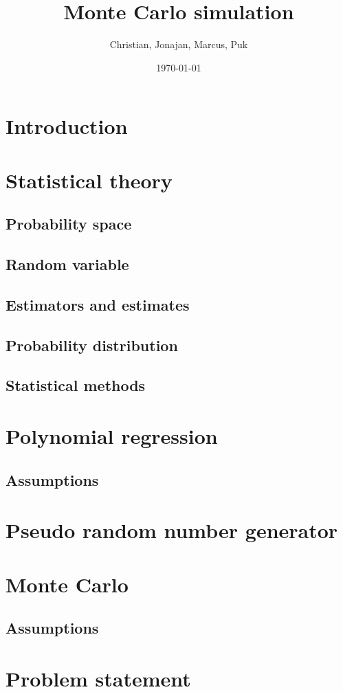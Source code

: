 \documentclass{article}
\title{Monte Carlo simulation}
\author{Christian, Jonajan, Marcus, Puk }
\date{\today}
\begin{document}
	\maketitle
	\newpage
	\tableofcontents
	\newpage
	\section{Introduction}
	\newpage
	\section{Statistical theory}
	\subsection{Probability space}
	\subsection{Random variable}
	\subsection{Estimators and estimates}
	\subsection{Probability distribution}
	\subsection{Statistical methods}
	\newpage
	\section{Polynomial regression}
	\subsection{Assumptions}
	\newpage
	\section{Pseudo random number generator}
	\newpage
	\section{Monte Carlo}
	\subsection{Assumptions}
	\newpage
	\section{Problem statement}
	\newpage
\end{document}
